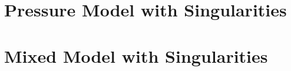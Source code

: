 \documentclass[bibliography=totocnumbered,dvipsnames,FM,Dis,EN]{tulthesis}
\begin{document}





\chapter{Pressure Model with Singularities} \label{chap:xfem_pressure}








\chapter{Mixed Model with Singularities} \label{chap:xfem_mh}










\end{document}
